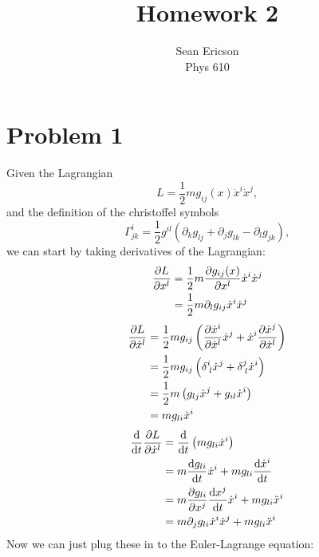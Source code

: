 \documentclass[12pt]{article}
\newcommand{\chrissym}[3]{\Gamma_{#2#3}^#1}
\newcommand{\partialg}[3]{\partial_{#1}g_{#2#3}}
\begin{document}
\title{Homework 2}
\author{Sean Ericson \\ Phys 610}
\maketitle

\section*{Problem 1}
Given the Lagrangian
\[ L = \frac{1}{2}mg_{ij}(x)\dot{x}^i\dot{x}^j, \]
and the definition of the christoffel symbols
\[ \chrissym{i}{j}{k} = \frac{1}{2}g^{il}\left(\partialg{k}{l}{j} + \partialg{j}{l}{k} - \partialg{l}{j}{k}\right), \]
we can start by taking derivatives of the Lagrangian:
\begin{align*}
    \pdv{L}{x^l} &= \frac{1}{2}m\pdv{g_{ij}(x)}{x^l}\dot{x}^i\dot{x}^j \\
    &= \frac{1}{2}m\partialg{l}{i}{j}\dot{x}^i\dot{x}^j
\end{align*}
\begin{align*}
    \pdv{L}{\dot{x}^l} &= \frac{1}{2}mg_{ij}\left(\pdv{\dot{x}^i}{\dot{x}^l}\dot{x}^j + \dot{x}^i\pdv{\dot{x}^j}{\dot{x}^l}\right) \\
    &= \frac{1}{2}mg_{ij}\left(\delta_{\;l}^i\dot{x}^j + \delta_{\;l}^j\dot{x}^i\right) \\
    &= \frac{1}{2}m\left(g_{lj}\dot{x}^j + g_{il}\dot{x}^i\right) \\
    &= mg_{li}\dot{x}^i
\end{align*}
\begin{align*}
    \dv{t}\pdv{L}{\dot{x}^l} &= \dv{t}\left(mg_{li}\dot{x}^i\right) \\
    &= m\dv{g_{li}}{t}\dot{x}^i + mg_{li}\dv{\dot{x}^i}{t} \\
    &= m \pdv{g_{li}}{x^j}\dv{x^j}{t}\dot{x}^i + mg_{li}\ddot{x}^i \\
    &= m \partialg{j}{l}{i}\dot{x}^i\dot{x}^j + mg_{li}\ddot{x}^i
\end{align*}
Now we can just plug these in to the Euler-Lagrange equation:
\end{document}
